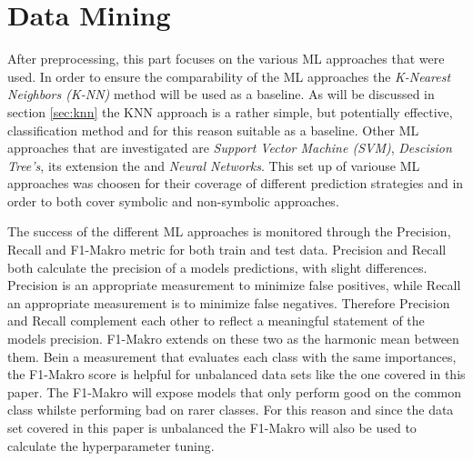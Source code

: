 \chapter{Data Mining}\label{sec:data_mining}





After preprocessing, this part focuses on the various ML approaches that were used. In order to ensure the comparability of the ML approaches the \textit{K-Nearest Neighbors (K-NN)} method will be used as a baseline. As will be discussed in section \ref{sec:knn} the KNN approach is a rather simple, but potentially effective, classification method and for this reason suitable as a baseline. Other ML approaches that are investigated are \textit{Support Vector Machine (SVM)}, \textit{Descision Tree's}, its extension the  and \textit{Neural Networks}. This set up of variouse ML approaches was choosen for their coverage of different prediction strategies and in order to both cover symbolic and non-symbolic approaches.

The success of the different ML approaches is monitored through the Precision, Recall and F1-Makro metric for both train and test data. 
Precision and Recall both calculate the precision of a models predictions, with slight differences. Precision is an appropriate measurement to minimize false positives, while Recall an appropriate measurement is to minimize false negatives. Therefore Precision and Recall complement each other to reflect a meaningful statement of the models precision.\cite{Brownlee2020} F1-Makro extends on these two as the harmonic mean between them. Bein a measurement that evaluates each class with the same importances, the F1-Makro score is helpful for unbalanced data sets like the one covered in this paper. The F1-Makro will expose models that only perform good on the common class whilste performing bad on rarer classes. For this reason and since the data set covered in this paper is unbalanced the F1-Makro will also be used to calculate the hyperparameter tuning.\cite{Peltarion2021}

